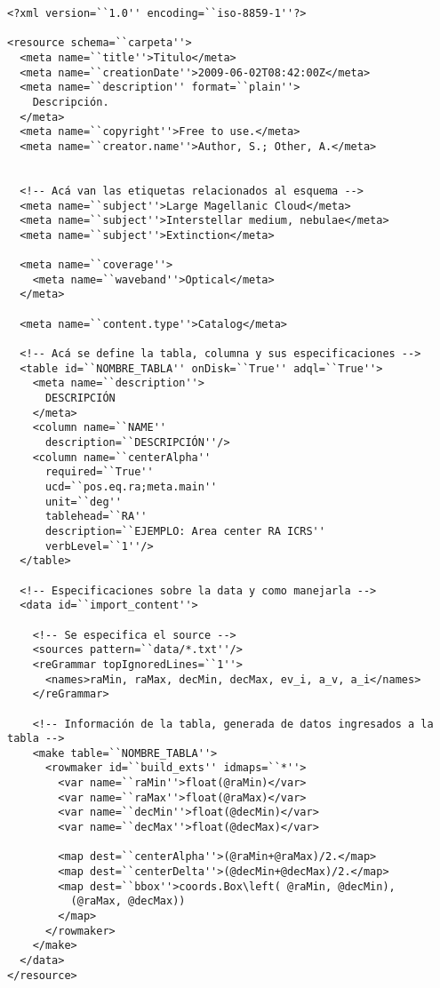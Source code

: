 \begin{verbatim}
<?xml version=``1.0'' encoding=``iso-8859-1''?>

<resource schema=``carpeta''>
  <meta name=``title''>Titulo</meta>
  <meta name=``creationDate''>2009-06-02T08:42:00Z</meta>
  <meta name=``description'' format=``plain''>
    Descripción.
  </meta>
  <meta name=``copyright''>Free to use.</meta>
  <meta name=``creator.name''>Author, S.; Other, A.</meta>
		 

  <!-- Acá van las etiquetas relacionados al esquema -->
  <meta name=``subject''>Large Magellanic Cloud</meta>
  <meta name=``subject''>Interstellar medium, nebulae</meta>
  <meta name=``subject''>Extinction</meta>

  <meta name=``coverage''>
    <meta name=``waveband''>Optical</meta>
  </meta>

  <meta name=``content.type''>Catalog</meta>

  <!-- Acá se define la tabla, columna y sus especificaciones --> 
  <table id=``NOMBRE_TABLA'' onDisk=``True'' adql=``True''>
    <meta name=``description''>
      DESCRIPCIÓN
    </meta>
    <column name=``NAME''
      description=``DESCRIPCIÓN''/>
    <column name=``centerAlpha''
      required=``True''
      ucd=``pos.eq.ra;meta.main''
      unit=``deg''
      tablehead=``RA''
      description=``EJEMPLO: Area center RA ICRS''
      verbLevel=``1''/>
  </table>
								     
  <!-- Especificaciones sobre la data y como manejarla -->
  <data id=``import_content''>

    <!-- Se especifica el source -->
    <sources pattern=``data/*.txt''/>
    <reGrammar topIgnoredLines=``1''>
      <names>raMin, raMax, decMin, decMax, ev_i, a_v, a_i</names>
    </reGrammar>
						    
    <!-- Información de la tabla, generada de datos ingresados a la tabla -->
    <make table=``NOMBRE_TABLA''>
      <rowmaker id=``build_exts'' idmaps=``*''>
        <var name=``raMin''>float(@raMin)</var>
        <var name=``raMax''>float(@raMax)</var>
        <var name=``decMin''>float(@decMin)</var>
        <var name=``decMax''>float(@decMax)</var>
					  
        <map dest=``centerAlpha''>(@raMin+@raMax)/2.</map>
        <map dest=``centerDelta''>(@decMin+@decMax)/2.</map>
        <map dest=``bbox''>coords.Box\left( @raMin, @decMin),
          (@raMax, @decMax))
        </map>
      </rowmaker>
    </make>
  </data>
</resource>
\end{verbatim}


